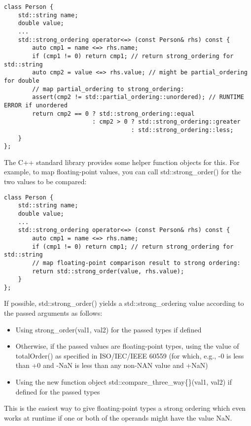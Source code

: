 \begin{lstlisting}[style=styleCXX]
class Person {
	std::string name;
	double value;
	...
	std::strong_ordering operator<=> (const Person& rhs) const {
		auto cmp1 = name <=> rhs.name;
		if (cmp1 != 0) return cmp1; // return strong_ordering for std::string
		auto cmp2 = value <=> rhs.value; // might be partial_ordering for double
		// map partial_ordering to strong_ordering:
		assert(cmp2 != std::partial_ordering::unordered); // RUNTIME ERROR if unordered
		return cmp2 == 0 ? std::strong_ordering::equal
		                 : cmp2 > 0 ? std::strong_ordering::greater
		                            : std::strong_ordering::less;
	}
};
\end{lstlisting}

The C++ standard library provides some helper function objects for this. For example, to map floating-point values, you can call std::strong\_order() for the two values to be compared:

\begin{lstlisting}[style=styleCXX]
class Person {
	std::string name;
	double value;
	...
	std::strong_ordering operator<=> (const Person& rhs) const {
		auto cmp1 = name <=> rhs.name;
		if (cmp1 != 0) return cmp1; // return strong_ordering for std::string
		// map floating-point comparison result to strong ordering:
		return std::strong_order(value, rhs.value);
	}
};
\end{lstlisting}

If possible, std::strong\_order() yields a std::strong\_ordering value according to the passed arguments as follows:

\begin{itemize}
\item
Using strong\_order(val1, val2) for the passed types if defined

\item
Otherwise, if the passed values are floating-point types, using the value of totalOrder() as specified in ISO/IEC/IEEE 60559 (for which, e.g., -0 is less than +0 and -NaN is less than any non-NAN value and +NaN)

\item
Using the new function object std::compare\_three\_way\{\}(val1, val2) if defined for the passed types
\end{itemize}

This is the easiest way to give floating-point types a strong ordering which even works at runtime if one or both of the operands might have the value NaN.

